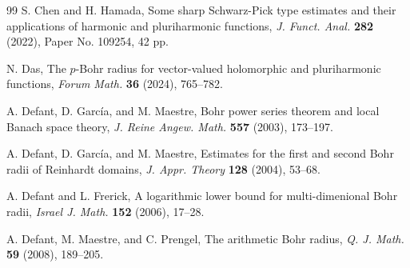 \documentclass[a4paper,11pt, reqno]{amsart}
\theoremstyle{definition}
\begin{document}
\begin{thebibliography}{99}
	 {\sc S. Chen} and {\sc H. Hamada},  Some sharp Schwarz-Pick type estimates and their applications of harmonic and pluriharmonic functions, {\it J. Funct. Anal.} {\bf 282} (2022), Paper No. 109254, 42 pp.
	
		
	
	
	
	
	
	
	 {\sc N. Das}, The $p$-Bohr radius for vector-valued holomorphic and pluriharmonic functions, {\it Forum Math.} {\bf 36} (2024), 765--782.
	
	 {\sc A. Defant, D. Garc\'{i}a}, and {\sc  M. Maestre}, Bohr power series theorem and local Banach space theory, {\it J. Reine Angew. Math.} {\bf 557} (2003), 173--197.
	
	 {\sc A. Defant, D. Garc\'{i}a}, and {\sc  M. Maestre}, Estimates for the first and second Bohr radii of Reinhardt domains, {\it J. Appr. Theory} {\bf 128} (2004), 53--68.
	
	 {\sc A. Defant} and {\sc L. Frerick}, A logarithmic lower bound for multi-dimenional Bohr radii, {\it Israel J. Math.} {\bf 152} (2006), 17--28.
	
	 {\sc A. Defant,  M. Maestre}, and {\sc  C. Prengel}, The arithmetic Bohr radius, {\it Q. J. Math.} {\bf 59} (2008), 189--205.
	

\end{thebibliography}
\end{document}
